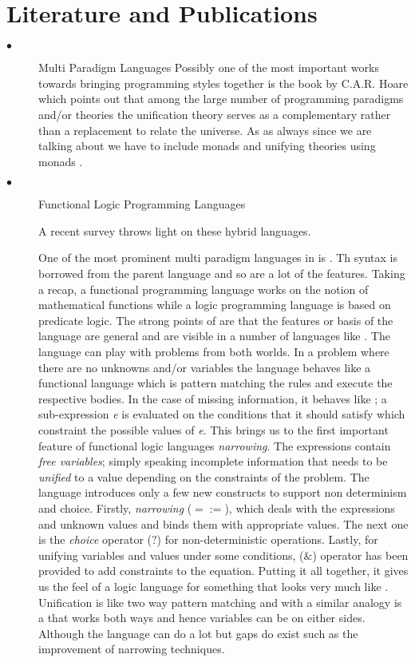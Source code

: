 \documentclass[thesis-solanki.tex]{subfiles}
\begin{document}
\section{Literature and Publications}
\begin{description}
\item[$\bullet$] Multi Paradigm Languages
  Possibly one of the most important works towards bringing programming styles together is the book by C.A.R.
  Hoare \cite{hoare1998unifying} which points out that among the large number of programming paradigms and/or
  theories the unification theory serves as a complementary rather than a replacement to relate the universe.
  As as always since we are talking about  we have to include monads and unifying theories using
  monads \cite{gibbons2013unifying}.
 

\item[$\bullet$] Functional Logic Programming Languages

A recent survey \cite{hanus2007multi} throws light on these hybrid languages. 

One of the most prominent multi paradigm languages in  is 
\cite{antoy2010functional}.
Th syntax is borrowed from the parent language and so are a lot of the features.
Taking a recap, a functional programming language works on the notion of mathematical functions while a logic
programming language is based on predicate logic.
The strong points of  are that the features or basis of the language are general and are visible in
a number of languages like \cite{website:toy}.
The language can play with problems from both worlds.
In a problem where there are no unknowns and/or variables the language behaves like a functional language which is
pattern matching the rules and execute the respective bodies.
In the case of missing information, it behaves like ; a sub-expression \textit{e} is evaluated on
the conditions that it should satisfy which constraint the possible values of \textit{e}.
This brings us to the first important feature of functional logic languages \textit{narrowing}.
The expressions contain \textit{free variables}; simply speaking incomplete information that needs to be
\textit{unified} to a value depending on the constraints of the problem.
The language introduces only a few new constructs to support non determinism and choice.
Firstly, \textit{narrowing} ($\mathtt{=:=}$), which deals with the expressions and unknown values and binds them
with appropriate values.
The next one is the \textit{choice} operator ($\mathtt{?}$) for non-deterministic operations.
Lastly, for unifying variables and values under some conditions, ($\mathtt{\&}$) operator has been provided to add
constraints to the equation.
Putting it all together, it gives us the feel of a logic language for something that looks very much like
.
Unification is like two way pattern matching and with a similar analogy  is a 
that works both ways and hence variables can be on either sides.
Although the language can do a lot but gaps do exist such as the improvement of narrowing techniques.
 

\end{description}
\end{document}
